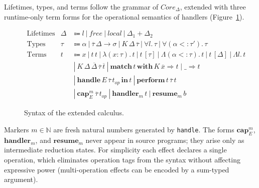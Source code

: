 \documentclass[12pt,a4paper]{article}
\newcommand{\vor}{~|~}
\newcommand{\keyword}[1]{\mathbf{#1}}
\begin{document}
    Lifetimes, types, and terms follow the grammar of $Core_\Delta$, extended with three
    runtime-only term forms for the operational semantics of handlers
    (Figure~\ref{fig:syntax}).
    \begin{figure}[h]
        \centering
        \[
            \begin{array}{lrl}
                \text{Lifetimes}        & \Delta & \Coloneqq l \vor free \vor local \vor \Delta_1 + \Delta_2 \\
                \text{Types}            & \tau   & \Coloneqq \alpha \vor \overline{\tau}\,\Delta \to \sigma
                                                    \vor K\,\Delta\,\overline{\tau}
                                                    \vor \forall l.\,\tau \vor \forall (\alpha <: \tau').\,\tau \\
                \text{Terms}            & t      & \Coloneqq x \vor t\,t \vor \lambda(x : \tau).\,t
                                                    \vor t\,[\tau] \vor \Lambda(\alpha <: \tau).\,t
                                                    \vor t\,[\Delta] \vor \Lambda l.\,t \\
                                        &        & \vor K\,\Delta\,\overline{\Delta}\,\overline{\tau}\,\overline{t}
                                                    \vor \keyword{match}\,t\,\keyword{with}\,K\,\overline{x} \Rightarrow t \mid \_ \Rightarrow t \\
                                        &        & \vor \keyword{handle}\,E\,\overline{\tau}\,t_{op}\,\keyword{in}\,t
                                                    \vor \keyword{perform}\,t\,\overline{\tau}\,t \\
                                        &        & \vor \keyword{cap}_E^m\,\overline{\tau}\,t_{op}
                                                    \vor \keyword{handler}_m\,t
                                                    \vor \keyword{resume}_m\,b
            \end{array}
        \]
        \caption{Syntax of the extended calculus.}
        \label{fig:syntax}
    \end{figure}
    Markers $m \in \mathbb{N}$ are fresh natural numbers generated by \texttt{handle}.
    The forms $\keyword{cap}_E^m$, $\keyword{handler}_m$, and $\keyword{resume}_m$ never
    appear in source programs; they arise only as intermediate reduction states.
    For simplicity each effect declares a single operation, which eliminates
    operation tags from the syntax without affecting expressive power
    (multi-operation effects can be encoded by a sum-typed argument).
\end{document}
